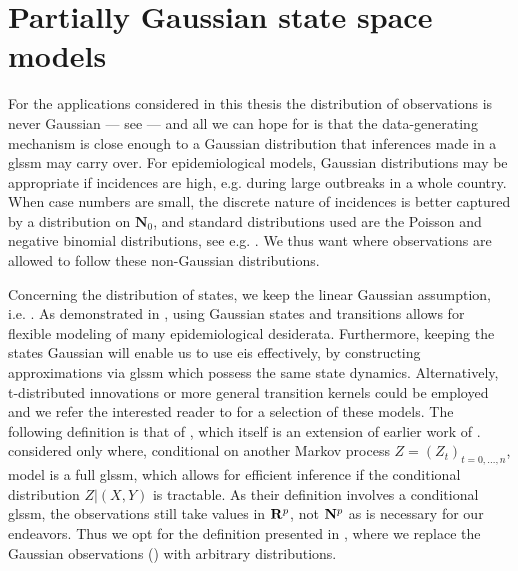 \section{Partially Gaussian state space models}
\label{sec:logconcave_gaussian_state_space_models}

For the applications considered in this thesis the distribution of observations is never Gaussian --- see  --- and  all we can hope for is that the data-generating mechanism is close enough to a Gaussian distribution that inferences made in a \acrshort{glssm} may carry over.
For epidemiological models, Gaussian distributions may be appropriate if incidences are high, e.g. during large outbreaks in a whole country. 
When case numbers are small, the discrete nature of incidences is better captured by a distribution on $\mathbf N_{0}$, and standard distributions used are the Poisson and negative binomial distributions, see e.g. \citep{Lloyd-Smith2005Superspreadinga}.
We thus want  where observations are allowed to follow these non-Gaussian distributions. 

Concerning the distribution of states, we keep the linear Gaussian assumption, i.e. . As demonstrated in , using Gaussian states and transitions allows for flexible modeling of many epidemiological desiderata. Furthermore, keeping the states Gaussian will enable us to use \acrfull{eis} effectively, by constructing approximations via \acrshort{glssm} which possess the same state dynamics. Alternatively, t-distributed innovations or more general transition kernels could be employed and we refer the interested reader to \citep[Part II]{Durbin2012Time} for a selection of these models. The following definition is that of \citep{Koopman2019Modified}, which itself is an extension of earlier work of \citep{Shephard1994Partial}. \citep{Shephard1994Partial} considered only  where, conditional on another Markov process $Z = (Z_{t})_{t = 0, \dots, n}$, model is a full \acrshort{glssm}, which allows for efficient inference if the conditional distribution $Z| (X, Y)$ is tractable. As their definition involves a conditional \acrshort{glssm}, the observations still take values in $\mathbf R^{p}$, not $\mathbf N^{p}$ as is necessary for our endeavors. Thus we opt for the definition presented in \citep{Koopman2019Modified}, where we replace the Gaussian observations () with arbitrary distributions.

